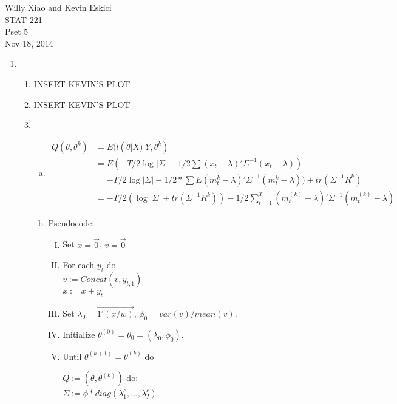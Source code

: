 \documentclass[paper=a4, fontsize=11pt]{scrartcl}
\begin{document}
\noindent Willy Xiao and Kevin Eskici \\ STAT 221 \\Pset 5\\ Nov 18, 2014
\begin{enumerate}
  \item
    \begin{enumerate}[1]
      \item INSERT KEVIN'S PLOT
      \item INSERT KEVIN'S PLOT
      \item
        \begin{enumerate}[a.]
          \item
          \begin{align*}
            Q(\theta, \theta^k) &= E(l(\theta|X)|Y, \theta^k) \\
            &= E(-T/2\log{|\Sigma|} - 1/2\sum{(x_t-\lambda)'\Sigma^{-1}(x_t - \lambda)}) \\
            &= -T/2\log{|\Sigma|} - 1/2*\sum{E(m_t^k - \lambda)'\Sigma^{-1}(m_t^k - \lambda)) + tr(\Sigma^{-1}R^{k})} \\
            &= -T/2(\log{|\Sigma|} + tr(\Sigma^{-1}R^k)) - 1/2\sum_{t=1}^{T}{(m_t^{(k)} - \lambda)'\Sigma^{-1}(m_t^{(k)} - \lambda)}
          \end{align*}
          \item Pseudocode:
            \begin{enumerate}[I.]
              \item Set $x = \vec{0}$, $v = \vec{0}$
              \item For each $y_t$ do \\
                \indent $v := Concat(v, y_{t,1})$ \\
                \indent $x := x + y_t$
              \item Set $\lambda_0 = \overrightarrow{1'(x/w)}$, $\phi_0 = var(v)/mean(v)$.
              \item Initialize $\theta^{(0)} = \theta_0 = (\lambda_0, \phi_0)$.
              \item Until $\theta^{(k+1)} = \theta^{(k)}$ do \\
                \begin{tabbing}
                  \hspace{1cm} $Q := (\theta, \theta^{(k)})$ do: \\
                  \hspace{2cm} $\Sigma := \phi*diag(\lambda_1^c, \ldots, \lambda_I^c)$. \\

\end{tabbing}
\end{enumerate}
\end{enumerate}
\end{enumerate}
\end{enumerate}
\end{document}
